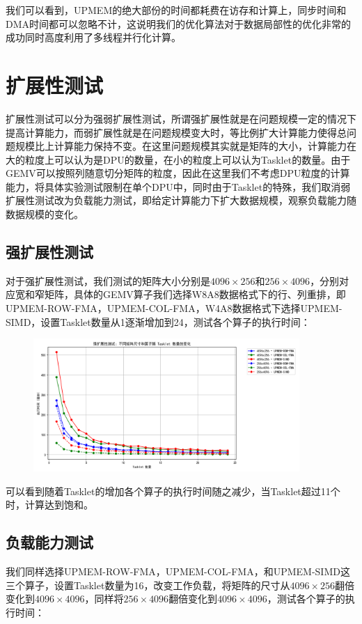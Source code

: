 我们可以看到，UPMEM的绝大部份的时间都耗费在访存和计算上，同步时间和DMA时间都可以忽略不计，这说明我们的优化算法对于数据局部性的优化非常的成功同时高度利用了多线程并行化计算。

\section{扩展性测试}
扩展性测试可以分为强弱扩展性测试，所谓强扩展性就是在问题规模一定的情况下提高计算能力，而弱扩展性就是在问题规模变大时，等比例扩大计算能力使得总问题规模比上计算能力保持不变。在这里问题规模其实就是矩阵的大小，计算能力在大的粒度上可以认为是DPU的数量，在小的粒度上可以认为Tasklet的数量。由于GEMV可以按照列随意切分矩阵的粒度，因此在这里我们不考虑DPU粒度的计算能力，将具体实验测试限制在单个DPU中，同时由于Tasklet的特殊，我们取消弱扩展性测试改为负载能力测试，即给定计算能力下扩大数据规模，观察负载能力随数据规模的变化。

\subsection{强扩展性测试}
对于强扩展性测试，我们测试的矩阵大小分别是$4096\times 256$和$256\times 4096$，分别对应宽和窄矩阵，具体的GEMV算子我们选择W8A8数据格式下的行、列重排，即UPMEM-ROW-FMA，UPMEM-COL-FMA，W4A8数据格式下选择UPMEM-SIMD，设置Tasklet数量从1逐渐增加到24，测试各个算子的执行时间：

\begin{figure}[htbp]
    \centering
    \includegraphics[width=0.9\textwidth]{figures/Exp3-1.png}
    \caption{}
	\label{EXP3-1} %
\end{figure}

可以看到随着Tasklet的增加各个算子的执行时间随之减少，当Tasklet超过11个时，计算达到饱和。

\subsection{负载能力测试}
我们同样选择UPMEM-ROW-FMA，UPMEM-COL-FMA，和UPMEM-SIMD这三个算子，设置Tasklet数量为16，改变工作负载，将矩阵的尺寸从$4096\times 256$翻倍变化到$4096\times 4096$，同样将$256\times 4096$翻倍变化到$4096\times 4096$，测试各个算子的执行时间：

